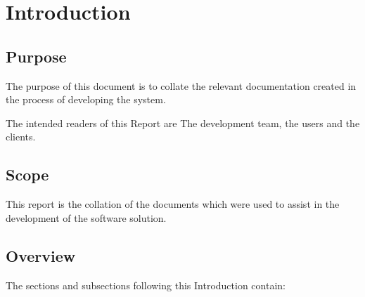 
\chapter{Introduction} %

\label{Part1Chapter1} %




\section{Purpose}

The purpose of this document is to collate the relevant documentation created in the process of developing the system.

The intended readers of this Report are The development team, the users and the clients. 


\section{Scope}

This report is the collation of the documents which were used to assist in the development of the software solution.
%


\section{Overview}

The sections and subsections following this Introduction contain:

